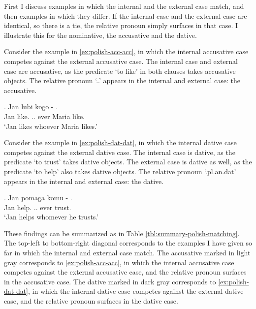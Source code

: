 First I discuss examples in which the internal and the external case match, and then examples in which they differ. If the internal case and the external case are identical, so there is a tie, the relative pronoun simply surfaces in that case. I illustrate this for the nominative, the accusative and the dative.

Consider the example in \ref{ex:polish-acc-acc}, in which the internal accusative case competes against the external accusative case.
The internal case and external case are accusative, as the predicate  `to like' in both clauses takes accusative objects.
The relative pronoun  `..' appears in the internal and external case: the accusative.

\exg. Jan lubi kogo -  .\\
 Jan like.\scsub{[acc]} .. ever Maria like.\scsub{[acc]}\\
 `Jan likes whoever Maria likes.' \label{ex:polish-acc-acc}

Consider the example in \ref{ex:polish-dat-dat}, in which the internal dative case competes against the external dative case.
The internal case is dative, as the predicate  `to trust' takes dative objects.
The external case is dative as well, as the predicate  `to help' also takes dative objects.
The relative pronoun  `.\ac{pl}.\ac{an}.\ac{dat}' appears in the internal and external case: the dative.

\exg. Jan pomaga komu - .\\
 Jan help.\scsub{[dat]} .. ever trust.\scsub{[dat]}\\
 `Jan helps whomever he trusts.' \label{ex:polish-dat-dat}

These findings can be summarized as in Table \ref{tbl:summary-polish-matching}. The top-left to bottom-right diagonal corresponds to the examples I have given so far in which the internal and external case match. The accusative marked in light gray corresponds to \ref{ex:polish-acc-acc}, in which the internal accusative case competes against the external accusative case, and the relative pronoun surfaces in the accusative case. The dative marked in dark gray corresponds to \ref{ex:polish-dat-dat}, in which the internal dative case competes against the external dative case, and the relative pronoun surfaces in the dative case.

